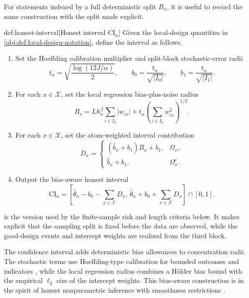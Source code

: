 For statements indexed by a full deterministic split \(B_n\), it is useful to record the same construction with the split made explicit.

\begin{algorithmv}{def:honest-interval}[Honest interval \(\mathrm{CI}_n\)]
Given the local-design quantities in \cref{obj:def:local-design-notation}, define the interval as follows.
\begin{enumerate}
\item Set the Hoeffding calibration multiplier and split-block stochastic-error radii
\[
t_\alpha=\sqrt{\frac{\log(12J/\alpha)}{2}},
\qquad
b_0=\frac{t_\alpha}{\sqrt{|I_0|}},
\qquad
b_1=\frac{t_\alpha}{\sqrt{|I_1|}}.
\]
\item For each \(x\in\mathcal X\), set the local regression bias-plus-noise radius
\[
B_x
=
Lh_n^\beta\sum_{i\in I_2}|w_{ix}|
+
t_\alpha\left(\sum_{i\in I_2}w_{ix}^2\right)^{1/2}.
\]
\item For each \(x\in\mathcal X\), set the atom-weighted interval contribution
\[
D_x
=
\begin{cases}
(\widehat b_x+b_1)B_x+b_1,& \Omega_x,\\
\widehat b_x+b_1,& \Omega_x^{c}.
\end{cases}
\]
\item Output the bias-aware honest interval
\[
\mathrm{CI}_n
=
\left[
\widehat\theta_n-b_0-\sum_{x\in\mathcal X}D_x,\,
\widehat\theta_n+b_0+\sum_{x\in\mathcal X}D_x
\right]\cap[0,1].
\]
\end{enumerate}
\end{algorithmv}

 is the version used by the finite-sample risk and length criteria below. It makes explicit that the sampling split is fixed before the data are observed, while the good-design events and intercept weights are realized from the third block.

The confidence interval adds deterministic bias allowances to concentration radii. The stochastic terms use Hoeffding-type calibration for bounded outcomes and indicators \citep{Hoeffding1963}, while the local regression radius combines a Hölder bias bound with the empirical \(\ell_2\) size of the intercept weights. This bias-aware construction is in the spirit of honest nonparametric inference with smoothness restrictions \citep{ArmstrongKolesar2018OptimalInference,ArmstrongKolesar2020}.

